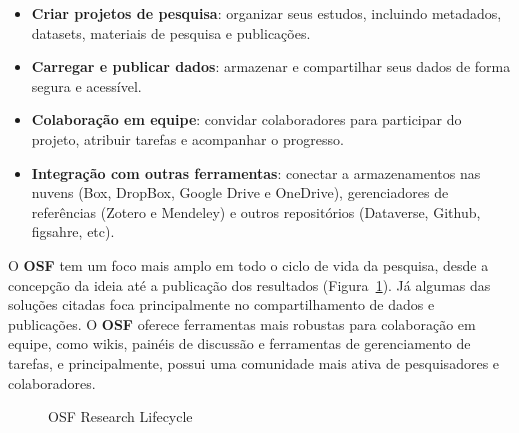 \documentclass[
  a4paper,
]{article}
\providecommand{\tightlist}{%
  \setlength{\itemsep}{0pt}\setlength{\parskip}{0pt}}\usepackage{longtable,booktabs,array}
\begin{document}
\begin{itemize}
\tightlist
\item
  \textbf{Criar projetos de pesquisa}: organizar seus estudos, incluindo
  metadados, datasets, materiais de pesquisa e publicações.
\item
  \textbf{Carregar e publicar dados}: armazenar e compartilhar seus
  dados de forma segura e acessível.
\item
  \textbf{Colaboração em equipe}: convidar colaboradores para participar
  do projeto, atribuir tarefas e acompanhar o progresso.
\item
  \textbf{Integração com outras ferramentas}: conectar a armazenamentos
  nas nuvens (Box, DropBox, Google Drive e OneDrive), gerenciadores de
  referências (Zotero e Mendeley) e outros repositórios (Dataverse,
  Github, figsahre, etc).
\end{itemize}

O \textbf{OSF} tem um foco mais amplo em todo o ciclo de vida da
pesquisa, desde a concepção da ideia até a publicação dos resultados
(Figura~\ref{fig-osf-researchcycle}). Já algumas das soluções citadas
foca principalmente no compartilhamento de dados e publicações. O
\textbf{OSF} oferece ferramentas mais robustas para colaboração em
equipe, como wikis, painéis de discussão e ferramentas de gerenciamento
de tarefas, e principalmente, possui uma comunidade mais ativa de
pesquisadores e colaboradores.

\begin{figure}


\caption{\label{fig-osf-researchcycle}OSF Research Lifecycle}

\end{figure}%
\end{document}
